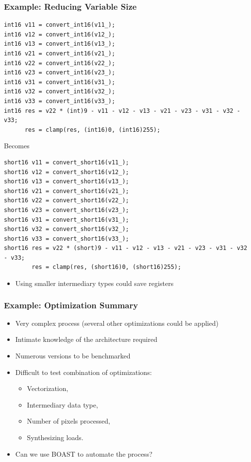 \documentclass{beamer}
\begin{document}
\begin{frame}[fragile]
  \frametitle{Example: Reducing Variable Size}
\tiny
\begin{lstlisting}
int16 v11 = convert_int16(v11_);
int16 v12 = convert_int16(v12_);
int16 v13 = convert_int16(v13_);
int16 v21 = convert_int16(v21_);
int16 v22 = convert_int16(v22_);
int16 v23 = convert_int16(v23_);
int16 v31 = convert_int16(v31_);
int16 v32 = convert_int16(v32_);
int16 v33 = convert_int16(v33_);
int16 res = v22 * (int)9 - v11 - v12 - v13 - v21 - v23 - v31 - v32 - v33;
      res = clamp(res, (int16)0, (int16)255);
\end{lstlisting}
\normalsize
\centering Becomes
\tiny
\begin{lstlisting}
short16 v11 = convert_short16(v11_);
short16 v12 = convert_short16(v12_);
short16 v13 = convert_short16(v13_);
short16 v21 = convert_short16(v21_);
short16 v22 = convert_short16(v22_);
short16 v23 = convert_short16(v23_);
short16 v31 = convert_short16(v31_);
short16 v32 = convert_short16(v32_);
short16 v33 = convert_short16(v33_);
short16 res = v22 * (short)9 - v11 - v12 - v13 - v21 - v23 - v31 - v32 - v33;
        res = clamp(res, (short16)0, (short16)255);
\end{lstlisting}
\begin{itemize}
\item Using smaller intermediary types could save registers
\end{itemize}
\end{frame}

\begin{frame}
  \frametitle{Example: Optimization Summary}
  \begin{itemize}
    \item Very complex process (several other optimizations could be applied)
    \item Intimate knowledge of the architecture required
    \item Numerous versions to be benchmarked
    \item Difficult to test combination of optimizations:
    \begin{itemize}
      \item Vectorization,
      \item Intermediary data type,
      \item Number of pixels processed,
      \item Synthesizing loads.
    \end{itemize}
    \item Can we use BOAST to automate the process?
  \end{itemize}
\end{frame}
\end{document}
